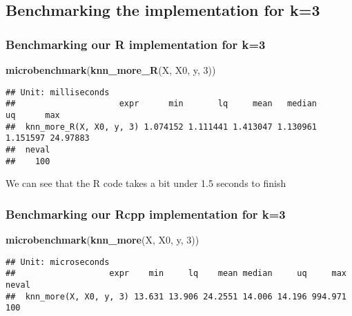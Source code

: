 \documentclass[]{article}
\newenvironment{Shaded}{\begin{snugshade}}{\end{snugshade}}
\newcommand{\DecValTok}[1]{\textcolor[rgb]{0.00,0.00,0.81}{#1}}
\newcommand{\KeywordTok}[1]{\textcolor[rgb]{0.13,0.29,0.53}{\textbf{#1}}}
\newcommand{\NormalTok}[1]{#1}
\begin{document}
\hypertarget{benchmarking-the-implementation-for-k3}{%
\subsection{Benchmarking the implementation for
k=3}\label{benchmarking-the-implementation-for-k3}}

\hypertarget{benchmarking-our-r-implementation-for-k3}{%
\subsubsection{Benchmarking our R implementation for
k=3}\label{benchmarking-our-r-implementation-for-k3}}

\begin{Shaded}
\begin{Highlighting}[]
\KeywordTok{microbenchmark}\NormalTok{(}\KeywordTok{knn_more_R}\NormalTok{(X, X0, y, }\DecValTok{3}\NormalTok{))}
\end{Highlighting}
\end{Shaded}

\begin{verbatim}
## Unit: milliseconds
##                     expr      min       lq     mean   median       uq      max
##  knn_more_R(X, X0, y, 3) 1.074152 1.111441 1.413047 1.130961 1.151597 24.97883
##  neval
##    100
\end{verbatim}

We can see that the R code takes a bit under 1.5 seconds to finish

\hypertarget{benchmarking-our-rcpp-implementation-for-k3}{%
\subsubsection{Benchmarking our Rcpp implementation for
k=3}\label{benchmarking-our-rcpp-implementation-for-k3}}

\begin{Shaded}
\begin{Highlighting}[]
\KeywordTok{microbenchmark}\NormalTok{(}\KeywordTok{knn_more}\NormalTok{(X, X0, y, }\DecValTok{3}\NormalTok{))}
\end{Highlighting}
\end{Shaded}

\begin{verbatim}
## Unit: microseconds
##                   expr    min     lq    mean median     uq     max neval
##  knn_more(X, X0, y, 3) 13.631 13.906 24.2551 14.006 14.196 994.971   100
\end{verbatim}
\end{document}
